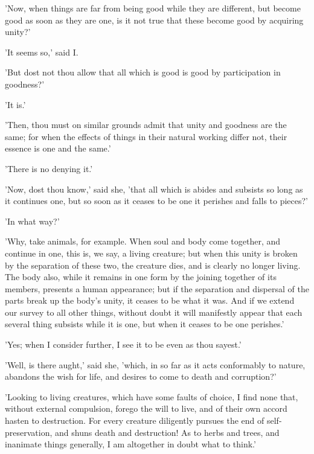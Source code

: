'Now, when things are far from being good while they are different, but
become good as soon as they are one, is it not true that these become
good by acquiring unity?'

'It seems so,' said I.

'But dost not thou allow that all which is good is good by participation
in goodness?'

'It is.'

'Then, thou must on similar grounds admit that unity and goodness are
the same; for when the effects of things in their natural working differ
not, their essence is one and the same.'

'There is no denying it.'

'Now, dost thou know,' said she, 'that all which is abides and subsists
so long as it continues one, but so soon as it ceases to be one it
perishes and falls to pieces?'

'In what way?'

'Why, take animals, for example. When soul and body come together, and
continue in one, this is, we say, a living creature; but when this unity
is broken by the separation of these two, the creature dies, and is
clearly no longer living. The body also, while it remains in one form by
the joining together of its members, presents a human appearance; but if
the separation and dispersal of the parts break up the body's unity, it
ceases to be what it was. And if we extend our survey to all other
things, without doubt it will manifestly appear that each several thing
subsists while it is one, but when it ceases to be one perishes.'

'Yes; when I consider further, I see it to be even as thou sayest.'

'Well, is there aught,' said she, 'which, in so far as it acts
conformably to nature, abandons the wish for life, and desires to come
to death and corruption?'

'Looking to living creatures, which have some faults of choice, I find
none that, without external compulsion, forego the will to live, and of
their own accord hasten to destruction. For every creature diligently
pursues the end of self-preservation, and shuns death and destruction!
As to herbs and trees, and inanimate things generally, I am altogether
in doubt what to think.'

